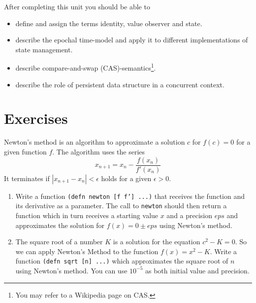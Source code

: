 \documentclass[11pt,a4paper]{article}
\begin{document}
After completing this unit you should be able to

\begin{itemize}
	\item define and assign the terms identity, value observer and state.
    \item describe the epochal time-model and apply it to different implementations of state management.
    \item describe compare-and-swap (CAS)-semantics\footnote{You may refer to a Wikipedia page on CAS.}.
    \item describe the role of persistent data structure in a concurrent context.
\end{itemize}


\section{Exercises}


\begin{exercise}
Newton's method is an algorithm to approximate a solution $c$ for $f(c)=0$ for a given function $f$.
The algorithm uses the series $$x_{n+1} = x_{n} - \frac{f(x_n)}{f'(x_n)}$$
It terminates if  $|x_{n+1} - x_n| < \epsilon$ holds for a given $\epsilon > 0$.

\begin{enumerate}[label=\alph*)]

  \item Write a function \texttt{(defn newton [f f'] ...)} that receives the function and its derivative as a parameter. The call to \texttt{newton} should then return a function which in turn receives a starting value $x$ and a precision $eps$ and approximates the solution for $f(x)=0 \pm eps$ using Newton's method.
  
   \item The square root of a number $K$ is a solution for the equation $c^2 - K = 0$. So we can apply Newton's Method to the function $f(x) = x^2 - K$. Write a function \texttt{(defn sqrt [n] ...)} which approximates the square root of $n$ using Newton's method. You can use $10^{-5}$ as both initial value and precision.
    


\end{enumerate}
\end{exercise}
\end{document}
